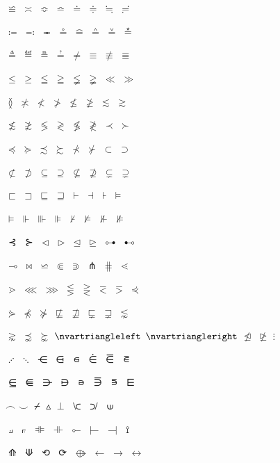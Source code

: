 \documentclass{article}
\begin{document}
$\backcong$ $\asymp$ $\Bumpeq$ $\bumpeq$ $\doteq$ $\Doteq$ $\fallingdotseq$ $\risingdotseq$ \par
$\coloneq$ $\eqcolon$ $\eqcirc$ $\circeq$ $\arceq$ $\wedgeq$ $\veeeq$ $\stareq$ \par
$\triangleq$ $\eqdef$ $\measeq$ $\questeq$ $\ne$ $\equiv$ $\nequiv$ $\Equiv$ \par
$\leq$ $\geq$ $\leqq$ $\geqq$ $\lneqq$ $\gneqq$ $\ll$ $\gg$ \par
$\between$ $\nasymp$ $\nless$ $\ngtr$ $\nleq$ $\ngeq$ $\lesssim$ $\gtrsim$ \par
$\nlesssim$ $\ngtrsim$ $\lessgtr$ $\gtrless$ $\nlessgtr$ $\ngtrless$ $\prec$ $\succ$ \par
$\preccurlyeq$ $\succcurlyeq$ $\precsim$ $\succsim$ $\nprec$ $\nsucc$ $\subset$ $\supset$ \par
$\nsubset$ $\nsupset$ $\subseteq$ $\supseteq$ $\nsubseteq$ $\nsupseteq$ $\subsetneq$ $\supsetneq$ \par
$\sqsubset$ $\sqsupset$ $\sqsubseteq$ $\sqsupseteq$ $\vdash$ $\dashv$ $\assert$ $\models$ \par
$\vDash$ $\Vdash$ $\Vvdash$ $\VDash$ $\nvdash$ $\nvDash$ $\nVdash$ $\nVDash$ \par
$\prurel$ $\scurel$ $\vartriangleleft$ $\vartriangleright$ $\trianglelefteq$ $\trianglerighteq$ $\origof$ $\imageof$ \par
$\multimap$ $\bowtie$ $\backsimeq$ $\Subset$ $\Supset$ $\pitchfork$ $\equalparallel$ $\lessdot$ \par
$\gtrdot$ $\lll$ $\ggg$ $\lesseqgtr$ $\gtreqless$ $\eqless$ $\eqgtr$ $\curlyeqprec$ \par
$\curlyeqsucc$ $\npreccurlyeq$ $\nsucccurlyeq$ $\nsqsubseteq$ $\nsqsupseteq$ $\sqsubsetneq$ $\sqsupsetneq$ $\lnsim$ \par
$\gnsim$ $\precnsim$ $\succnsim$ $\nvartriangleleft$ $\nvartriangleright$ $\ntrianglelefteq$ $\ntrianglerighteq$ $\vdots$ \par
$\adots$ $\ddots$ $\disin$ $\varisins$ $\isins$ $\isindot$ $\varisinobar$ $\isinobar$ \par
$\isinvb$ $\isinE$ $\nisd$ $\varnis$ $\nis$ $\varniobar$ $\niobar$ $\bagmember$ \par
$\frown$ $\smile$ $\APLnotslash$ $\vartriangle$ $\perp$ $\bsolhsub$ $\suphsol$ $\upin$ \par
$\pullback$ $\pushout$ $\DashVDash$ $\dashVdash$ $\multimapinv$ $\vlongdash$ $\longdashv$ $\cirbot$ \par
$\UUparrow$ $\DDownarrow$ $\acwgapcirclearrow$ $\cwgapcirclearrow$ $\rightarrowonoplus$ $\longleftarrow$ $\longrightarrow$ $\longleftrightarrow$ \par
\end{document}
